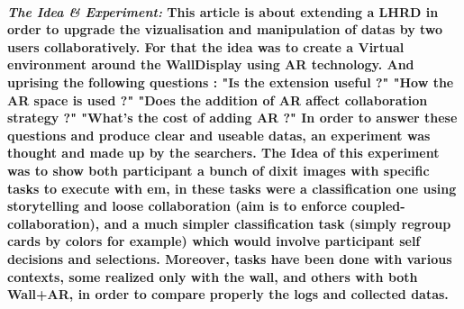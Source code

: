 \documentclass{article}
\begin{document}
    \paragraph{ \textit{The Idea \& Experiment:} 
                \newline
                \indent \indent \textnormal{This article is about extending a LHRD in order to upgrade the vizualisation and manipulation of datas by two
                users collaboratively. For that the idea was to create a Virtual environment around the WallDisplay using AR technology. And uprising the following questions :
                \newline \indent "Is the extension useful ?" 
                \newline \indent "How the AR space is used ?"
                \newline \indent "Does the addition of AR affect collaboration strategy ?"
                \newline \indent "What's the cost of adding AR ?"}
                \indent \indent \textnormal{In order to answer these questions and produce clear and useable datas, an experiment was thought and made up by the searchers. 
                The Idea of this experiment was to show both participant a bunch of dixit images with specific tasks to execute with em, in these tasks were a classification 
                one using storytelling and loose collaboration (aim is to enforce coupled-collaboration), and a much simpler classification task (simply regroup cards by colors 
                for example) which would involve participant self decisions and selections. Moreover, tasks have been done with various contexts, some realized only with the wall,
                and others with both Wall+AR, in order to compare properly the logs and collected datas.}}
\end{document}
